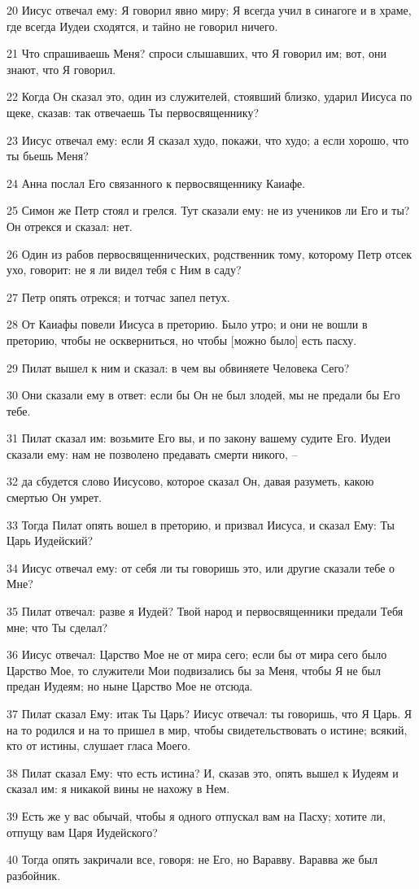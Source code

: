 \par 20 Иисус отвечал ему: Я говорил явно миру; Я всегда учил в синагоге и в храме, где всегда Иудеи сходятся, и тайно не говорил ничего.
\par 21 Что спрашиваешь Меня? спроси слышавших, что Я говорил им; вот, они знают, что Я говорил.
\par 22 Когда Он сказал это, один из служителей, стоявший близко, ударил Иисуса по щеке, сказав: так отвечаешь Ты первосвященнику?
\par 23 Иисус отвечал ему: если Я сказал худо, покажи, что худо; а если хорошо, что ты бьешь Меня?
\par 24 Анна послал Его связанного к первосвященнику Каиафе.
\par 25 Симон же Петр стоял и грелся. Тут сказали ему: не из учеников ли Его и ты? Он отрекся и сказал: нет.
\par 26 Один из рабов первосвященнических, родственник тому, которому Петр отсек ухо, говорит: не я ли видел тебя с Ним в саду?
\par 27 Петр опять отрекся; и тотчас запел петух.
\par 28 От Каиафы повели Иисуса в преторию. Было утро; и они не вошли в преторию, чтобы не оскверниться, но чтобы [можно было] есть пасху.
\par 29 Пилат вышел к ним и сказал: в чем вы обвиняете Человека Сего?
\par 30 Они сказали ему в ответ: если бы Он не был злодей, мы не предали бы Его тебе.
\par 31 Пилат сказал им: возьмите Его вы, и по закону вашему судите Его. Иудеи сказали ему: нам не позволено предавать смерти никого, --
\par 32 да сбудется слово Иисусово, которое сказал Он, давая разуметь, какою смертью Он умрет.
\par 33 Тогда Пилат опять вошел в преторию, и призвал Иисуса, и сказал Ему: Ты Царь Иудейский?
\par 34 Иисус отвечал ему: от себя ли ты говоришь это, или другие сказали тебе о Мне?
\par 35 Пилат отвечал: разве я Иудей? Твой народ и первосвященники предали Тебя мне; что Ты сделал?
\par 36 Иисус отвечал: Царство Мое не от мира сего; если бы от мира сего было Царство Мое, то служители Мои подвизались бы за Меня, чтобы Я не был предан Иудеям; но ныне Царство Мое не отсюда.
\par 37 Пилат сказал Ему: итак Ты Царь? Иисус отвечал: ты говоришь, что Я Царь. Я на то родился и на то пришел в мир, чтобы свидетельствовать о истине; всякий, кто от истины, слушает гласа Моего.
\par 38 Пилат сказал Ему: что есть истина? И, сказав это, опять вышел к Иудеям и сказал им: я никакой вины не нахожу в Нем.
\par 39 Есть же у вас обычай, чтобы я одного отпускал вам на Пасху; хотите ли, отпущу вам Царя Иудейского?
\par 40 Тогда опять закричали все, говоря: не Его, но Варавву. Варавва же был разбойник.

